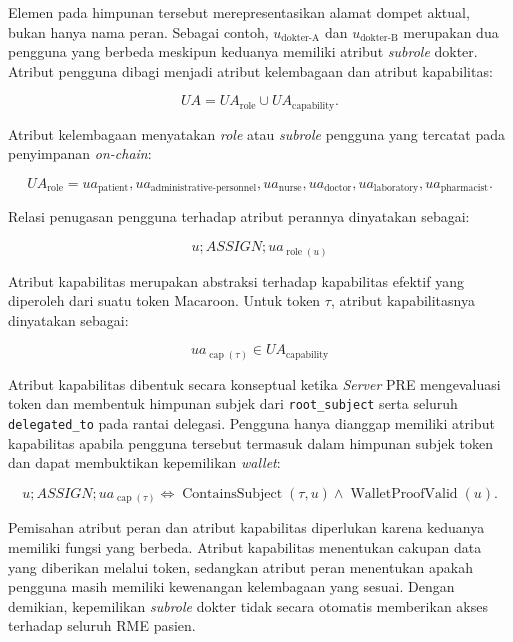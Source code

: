 Elemen pada himpunan tersebut merepresentasikan alamat dompet aktual, bukan hanya nama peran. Sebagai contoh, $u_{\text{dokter-A}}$ dan $u_{\text{dokter-B}}$ merupakan dua pengguna yang berbeda meskipun keduanya memiliki atribut \textit{subrole} dokter. Atribut pengguna dibagi menjadi atribut kelembagaan dan atribut kapabilitas:

\begin{equation}
	UA = UA_{\text{role}} \cup UA_{\text{capability}}.
\end{equation}

Atribut kelembagaan menyatakan \textit{role} atau \textit{subrole} pengguna yang tercatat pada penyimpanan \textit{on-chain}:

\begin{equation}
	UA_{\text{role}} =
		{
			ua_{\text{patient}},
			ua_{\text{administrative-personnel}},
			ua_{\text{nurse}},
			ua_{\text{doctor}},
			ua_{\text{laboratory}},
			ua_{\text{pharmacist}}
		}.
\end{equation}

Relasi penugasan pengguna terhadap atribut perannya dinyatakan sebagai:

\begin{equation}
	u ; ASSIGN ; ua_{\operatorname{role}(u)}
\end{equation}

Atribut kapabilitas merupakan abstraksi terhadap kapabilitas efektif yang diperoleh dari suatu token Macaroon. Untuk token $\tau$, atribut kapabilitasnya dinyatakan sebagai:

\begin{equation}
	ua_{\operatorname{cap}(\tau)}
	\in UA_{\text{capability}}
\end{equation}

Atribut kapabilitas dibentuk secara konseptual ketika \textit{Server} PRE mengevaluasi token dan membentuk himpunan subjek dari \texttt{root\_subject} serta seluruh \texttt{delegated\_to} pada rantai delegasi. Pengguna hanya dianggap memiliki atribut kapabilitas apabila pengguna tersebut termasuk dalam himpunan subjek token dan dapat membuktikan kepemilikan \textit{wallet}:

\begin{equation}
	u ; ASSIGN ; ua_{\operatorname{cap}(\tau)}
	\iff
	\operatorname{ContainsSubject}(\tau,u)
	\land
	\operatorname{WalletProofValid}(u).
\end{equation}

Pemisahan atribut peran dan atribut kapabilitas diperlukan karena keduanya memiliki fungsi yang berbeda. Atribut kapabilitas menentukan cakupan data yang diberikan melalui token, sedangkan atribut peran menentukan apakah pengguna masih memiliki kewenangan kelembagaan yang sesuai. Dengan demikian, kepemilikan \textit{subrole} dokter tidak secara otomatis memberikan akses terhadap seluruh RME pasien.

